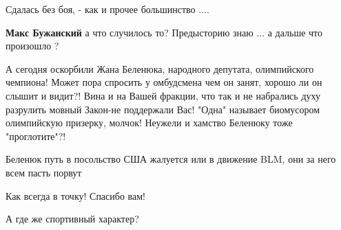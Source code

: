 \begin{itemize}
Сдалась без боя, - как и прочее большинство ....

 
\textbf{Макс Бужанский} а что случилось то? Предысторию знаю ... а дальше что произошло ?

 

А сегодня оскорбили Жана Беленюка, народного депутата, олимпийского чемпиона!
Может пора спросить у омбудсмена чем он занят, хорошо ли он слышит и видит?!
Вина и на Вашей фракции, что так и не набрались духу разрулить мовный Закон-не
поддержали Вас! "Одна" называет биомусором олимпийскую призерку, молчок!
Неужели и хамство Беленюку тоже "проглотите"?!

\begin{itemize}
 
Беленюк путь в посольство США жалуется или в движение BLM, они за него всем пасть порвут \Smiley[1.0][yellow]
\end{itemize}

 
Как всегда в точку! Спасибо вам!

 
А где же спортивный характер?

 


\end{itemize}
